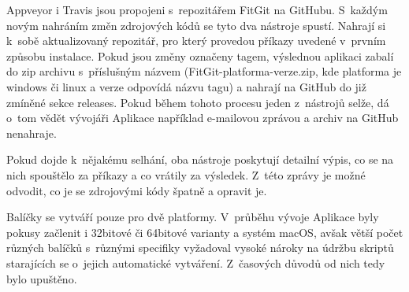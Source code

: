 Appveyor i Travis jsou propojeni s~repozitářem FitGit na GitHubu. S~každým novým nahráním změn zdrojových kódů se tyto dva nástroje spustí. Nahrají si k~sobě aktualizovaný repozitář, pro který provedou příkazy uvedené v~prvním způsobu instalace. Pokud jsou změny označeny tagem, výslednou aplikaci zabalí do zip archivu s~příslušným názvem (FitGit-platforma-verze.zip, kde platforma je windows či linux a verze odpovídá názvu tagu) a nahrají na GitHub do již zmíněné sekce releases. Pokud během tohoto procesu jeden z~nástrojů selže, dá o~tom vědět vývojáři Aplikace například e-mailovou zprávou a archiv na GitHub nenahraje.

Pokud dojde k~nějakému selhání, oba nástroje poskytují detailní výpis, co se na nich spouštělo za příkazy a co vrátily za výsledek. Z~této zprávy je možné odvodit, co je se zdrojovými kódy špatně a opravit je.

Balíčky se vytváří pouze pro dvě platformy. V~průběhu vývoje Aplikace byly pokusy začlenit i 32bitové či 64bitové varianty a systém macOS, avšak větší počet různých balíčků s~různými specifiky vyžadoval vysoké nároky na údržbu skriptů starajících se o~jejich automatické vytváření. Z~časových důvodů od nich tedy bylo upuštěno.
